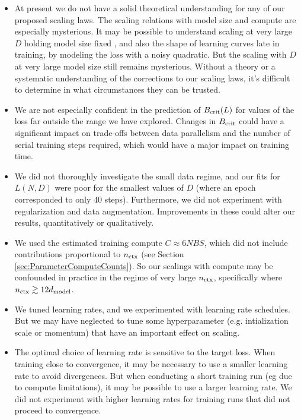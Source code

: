 \documentclass[english]{article}
\begin{document}
\begin{itemize}
\item At present we do not have a solid theoretical understanding for any of our proposed scaling laws.  The scaling relations with model size and compute are especially mysterious.  It may be possible to understand scaling at very large $D$ holding model size fixed \cite{1710.03667}, and also the shape of learning curves late in training, by modeling the loss with a noisy quadratic.  But the scaling with $D$ at very large model size still remains mysterious.  Without a theory or a systematic understanding of the corrections to our scaling laws, it's difficult to determine in what circumstances they can be trusted.  

\item  We are not especially confident in the prediction of $B_{\rm crit}(L)$ for values of the loss far outside the range we have explored.  Changes in $B_{\rm crit}$ could have a significant impact on trade-offs between data parallelism and the number of serial training steps required, which would have a major impact on training time.

\item We did not thoroughly investigate the small data regime, and our fits for $L(N,D)$ were poor for the smallest values of $D$ (where an epoch corresponded to only $40$ steps). Furthermore, we did not experiment with regularization and data augmentation. Improvements in these could alter our results,  quantitatively or qualitatively. 

\item We used the estimated training compute $C \approx 6 N B S$, which did not include contributions proportional to  $n_{\rm ctx}$ (see Section \ref{sec:ParameterComputeCounts}).  So our scalings with compute may be confounded in practice in the regime of very large $n_{\rm ctx}$, specifically where $n_{\rm ctx} \gtrsim 12 d_{\rm model}$.

\item We tuned learning rates, and we experimented with learning rate schedules.  But we may have neglected to tune some hyperparameter (e.g. intialization scale or  momentum) that have an important effect on scaling.

\item The optimal choice of learning rate is sensitive to the target loss. When training close to convergence, it may be necessary to use a smaller learning rate to avoid divergences.  But when conducting a short training run (eg due to compute limitations), it may be possible to use a larger learning rate.  We did not experiment with higher learning rates for training runs that did not proceed to convergence.
\end{itemize}
\end{document}
